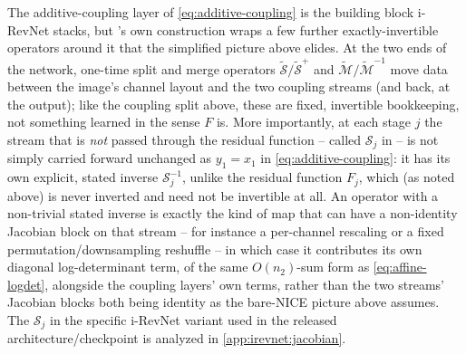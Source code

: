 \begin{remark}
\label{rem:irevnet-structure}
The additive-coupling layer of \cref{eq:additive-coupling} is the building block i-RevNet stacks, but
\cite{jacobsen2018}'s own construction wraps a few further exactly-invertible operators around it that the
simplified picture above elides. At the two ends of the network, one-time split and merge operators
$\tilde{\mathcal S}/\tilde{\mathcal S}^+$ and $\tilde{\mathcal M}/\tilde{\mathcal M}^{-1}$ move data between
the image's channel layout and the two coupling streams (and back, at the output); like the coupling split
above, these are fixed, invertible bookkeeping, not something learned in the sense $F$ is. More importantly,
at each stage $j$ the stream that is \emph{not} passed through the residual function -- called $\mathcal
S_j$ in \cite{jacobsen2018} -- is not simply carried forward unchanged as $y_1=x_1$ in \cref{eq:additive-coupling}: it has its own explicit, stated inverse $\mathcal S_j^{-1}$, unlike the residual function
$F_j$, which (as noted above) is never inverted and need not be invertible at all. An operator with a
non-trivial stated inverse is exactly the kind of map that can have a non-identity Jacobian block on that
stream -- for instance a per-channel rescaling or a fixed permutation/downsampling reshuffle -- in which
case it contributes its own diagonal log-determinant term, of the same $O(n_2)$-sum form as
\cref{eq:affine-logdet}, alongside the coupling layers' own terms, rather than the two streams' Jacobian
blocks both being identity as the bare-NICE picture above assumes. The $\mathcal S_j$ in the specific
i-RevNet variant used in
the released architecture/checkpoint is analyzed in \cref{app:irevnet:jacobian}.


\end{remark}
